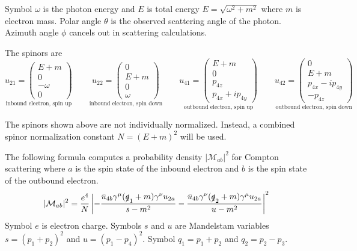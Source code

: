 \documentclass[12pt]{article}
\begin{document}
\noindent
Symbol $\omega$ is the photon energy and $E$ is total energy
$E=\sqrt{\omega^2+m^2}$ where $m$ is electron mass.
Polar angle $\theta$ is the observed scattering angle of the photon.
Azimuth angle $\phi$ cancels out in scattering calculations.

\bigskip
\noindent
The spinors are
\begin{equation*}
\underset{\text{inbound electron, spin up}}
{
u_{21}=\begin{pmatrix}
E+m\\
0\\
-\omega\\
0
\end{pmatrix}
}
\qquad
\underset{\text{inbound electron, spin down}}
{
u_{22}=\begin{pmatrix}
0\\
E+m\\
0\\
\omega
\end{pmatrix}
}
\qquad
\underset{\text{outbound electron, spin up}}
{
u_{41}=\begin{pmatrix}
E+m\\
0\\
p_{4z}\\
p_{4x}+ip_{4y}
\end{pmatrix}
}
\qquad
\underset{\text{outbound electron, spin down}}
{
u_{42}=\begin{pmatrix}
0\\
E+m\\
p_{4x}-ip_{4y}\\
-p_{4z}
\end{pmatrix}
}
\end{equation*}

\noindent
The spinors shown above are not individually normalized.
Instead, a combined spinor normalization constant $N=(E+m)^2$ will be used.

\bigskip
\noindent
The following formula computes a probability density $|\mathcal{M}_{ab}|^2$
for Compton scattering where $a$ is the spin state of the inbound electron
and $b$ is the spin state of the outbound electron.
\begin{equation*}
|\mathcal{M}_{ab}|^2
=
\frac{e^4}{N}
\left|
-\frac{\bar{u}_{4b}\gamma^\mu(\slashed{q}_1+m)\gamma^\nu u_{2a}}{s-m^2}
-\frac{\bar{u}_{4b}\gamma^\nu(\slashed{q}_2+m)\gamma^\mu u_{2a}}{u-m^2}
\right|^2
\end{equation*}
Symbol $e$ is electron charge.
Symbols $s$ and $u$ are Mandelstam variables $s=(p_1+p_2)^2$ and $u=(p_1-p_4)^2$.
Symbol $q_1=p_1+p_2$ and $q_2=p_2-p_3$.
\end{document}
